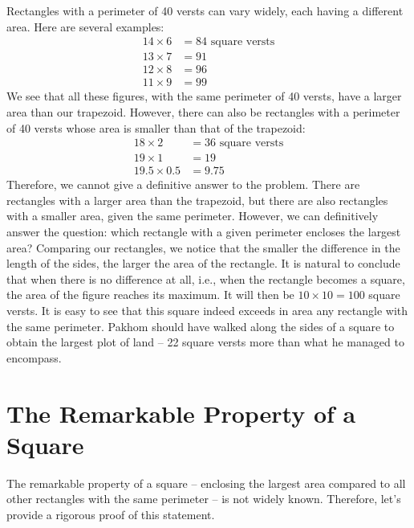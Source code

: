 \ques Rectangles with a perimeter of 40 versts can vary widely, each having a different area. Here are several examples:
\begin{align*}%
14 \times 6 & = 84 \,\, \text{square versts}\\
13 \times 7 & = 91 \\
12 \times 8 & = 96 \\
11 \times 9 & = 99
\end{align*}
We see that all these figures, with the same perimeter of 40 versts, have a larger area than our trapezoid. However, there can also be rectangles with a perimeter of 40 versts whose area is smaller than that of the trapezoid:
\begin{align*}%
18 \times 2 & = 36 \,\, \text{square versts}\\
19 \times 1 & = 19 \\
19.5 \times 0.5 & = 9.75
\end{align*}
Therefore, we cannot give a definitive answer to the problem. There are rectangles with a larger area than the trapezoid, but there are also rectangles with a smaller area, given the same perimeter. However, we can definitively answer the question: which rectangle with a given perimeter encloses the largest area? Comparing our rectangles, we notice that the smaller the difference in the length of the sides, the larger the area of the rectangle. It is natural to conclude that when there is no difference at all, i.e., when the rectangle becomes a square, the area of the figure reaches its maximum. It will then be $10 \times 10 = 100$ square versts. It is easy to see that this square indeed exceeds in area any rectangle with the same perimeter. Pakhom should have walked along the sides of a square to obtain the largest plot of land -- 22 square versts more than what he managed to encompass.


\section{The Remarkable Property of a Square}
\label{sec-12.4}

The remarkable property of a square -- enclosing the largest area compared to all other rectangles with the same perimeter -- is not widely known. Therefore, let's provide a rigorous proof of this statement.

